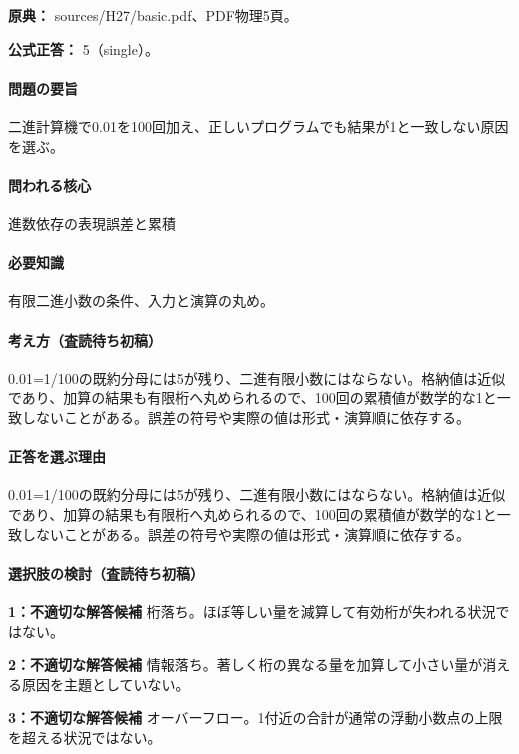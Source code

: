\noindent\textbf{原典：} sources/H27/basic.pdf、PDF物理5頁。

\textbf{公式正答：} 5（single）。

\paragraph{問題の要旨} 二進計算機で0.01を100回加え、正しいプログラムでも結果が1と一致しない原因を選ぶ。

\paragraph{問われる核心} 進数依存の表現誤差と累積

\paragraph{必要知識} 有限二進小数の条件、入力と演算の丸め。

\paragraph{考え方（査読待ち初稿）} 0.01=\allowbreak{}1/100の既約分母には5が残り、二進有限小数にはならない。格納値は近似であり、加算の結果も有限桁へ丸められるので、100回の累積値が数学的な1と一致しないことがある。誤差の符号や実際の値は形式・演算順に依存する。

\paragraph{正答を選ぶ理由} 0.01=\allowbreak{}1/100の既約分母には5が残り、二進有限小数にはならない。格納値は近似であり、加算の結果も有限桁へ丸められるので、100回の累積値が数学的な1と一致しないことがある。誤差の符号や実際の値は形式・演算順に依存する。

\paragraph{選択肢の検討（査読待ち初稿）}\mbox{}\par

\noindent\textbf{1：不適切な解答候補} 桁落ち。ほぼ等しい量を減算して有効桁が失われる状況ではない。\par

\noindent\textbf{2：不適切な解答候補} 情報落ち。著しく桁の異なる量を加算して小さい量が消える原因を主題としていない。\par

\noindent\textbf{3：不適切な解答候補} オーバーフロー。1付近の合計が通常の浮動小数点の上限を超える状況ではない。\par

